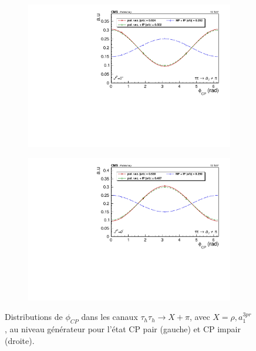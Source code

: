 \begin{figure}[]
  \begin{subfigure}[b]{0.5\linewidth}
    \centering
    \includegraphics[width=\linewidth]{Chapitre6/Images/A1PION/A1PION_even_gen.pdf} 
    \caption*{} 
    \vspace{0.5ex}
  \end{subfigure}%
  \begin{subfigure}[b]{0.5\linewidth}
    \centering
    \includegraphics[width=\linewidth]{Chapitre6/Images/A1PION/A1PION_odd_gen.pdf} 
    \caption*{} 
    \vspace{0.5ex}
  \end{subfigure} 
  \caption{Distributions de $\phi_{CP}$ dans les canaux $\tau_h\tau_h\rightarrow X+\pi$, avec $X=\rho,a^{3pr}_1$, au niveau générateur pour l'état CP pair (gauche) et CP impair (droite).}
  \label{CPgenXPI}
\end{figure}



